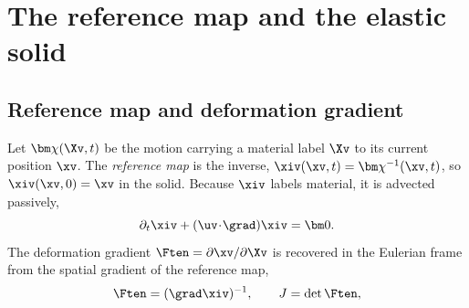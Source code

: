 \section{The reference map and the elastic solid}
\label{sec:rmt}

\subsection{Reference map and deformation gradient}
Let $\bm\chi(\Xv,t)$ be the motion carrying a material label $\Xv$ to its current
position $\xv$. The \emph{reference map} is the inverse,
$\xiv(\xv,t)=\bm\chi^{-1}(\xv,t)$, so $\xiv(\xv,0)=\xv$ in the solid. Because $\xiv$
labels material, it is advected passively,
\begin{equation}
\partial_t\xiv + (\uv\!\cdot\!\grad)\xiv = \bm 0 .
\label{eq:xi-advect}
\end{equation}
The deformation gradient $\Ften=\partial\xv/\partial\Xv$ is recovered in the Eulerian
frame from the spatial gradient of the reference map,
\begin{equation}
\Ften = (\grad\xiv)^{-1},
\qquad J=\det\Ften ,
\label{eq:F}
\end{equation}

